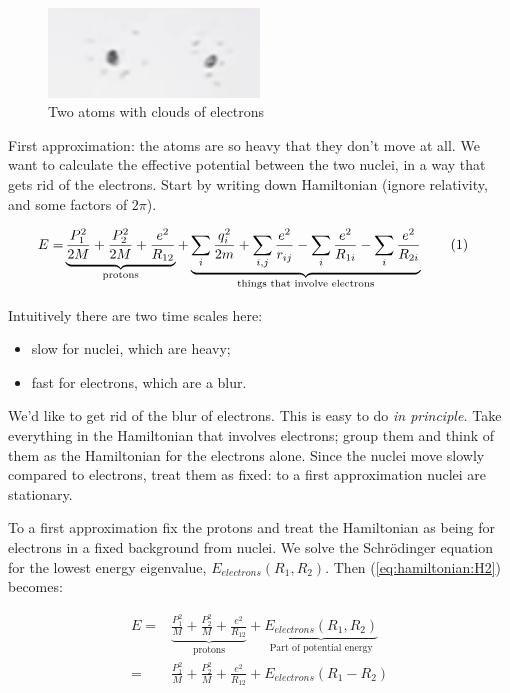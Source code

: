 \documentclass[]{article}
\newcommand\numberthis{\addtocounter{equation}{1}\tag{\theequation}}
\begin{document}
\begin{figure}[H]
	\begin{center}
		\caption{Two atoms with clouds of electrons}\label{fig:3-2-atoms}
		\includegraphics[width=0.5\textwidth]{3-2-atoms}
	\end{center}
\end{figure}

First approximation: the atoms are so heavy that they don't move at all. We want to calculate the effective potential between the two nuclei, in a way that gets rid of the electrons. Start by writing down Hamiltonian (ignore relativity, and some factors of $2\pi$).

\begin{align*}
	E=& \underbrace{\frac{P_1^2}{2M} + \frac{P_2^2}{2M} + \frac{e^2}{R_{12}}}_\text{protons} + \underbrace{\sum_i \frac{q_i^2}{2m} + \sum_{i,j}\frac{e^2}{r_{ij}}- \sum_i \frac{e^2}{R_{1i}} - \sum_i \frac{e^2}{R_{2i}}}_\text{things that involve electrons} \numberthis \label{eq:hamiltonian:H2}
\end{align*}

Intuitively there are two time scales here:
\begin{itemize}
	\item slow for nuclei, which are heavy;
	\item fast for electrons, which are a blur.
\end{itemize}

We'd like to get rid of the blur of electrons. This is easy to do \emph{in principle.} Take everything in the Hamiltonian that involves electrons; group them and think of them as the Hamiltonian for the electrons alone. Since the nuclei move slowly compared to electrons, treat them as fixed: to a first approximation nuclei are stationary.

To a first approximation fix the protons and treat the Hamiltonian as being for electrons in a fixed background from nuclei. We solve the Schr\"odinger equation for the lowest energy eigenvalue, $E_{electrons}(R_1,R_2)$. Then (\ref{eq:hamiltonian:H2}) becomes:


\begin{align*}
E=& \underbrace{\frac{P_1^2}{M} + \frac{P_2^2}{M} + \frac{e^2}{R_{12}}}_\text{protons} +\underbrace{ E_{electrons}(R_1,R_2)}_\text{Part of potential energy}\\
=& \frac{P_1^2}{M} + \frac{P_2^2}{M} + \frac{e^2}{R_{12}}+ E_{electrons}(R_1-R_2)
\end{align*}
\end{document}
